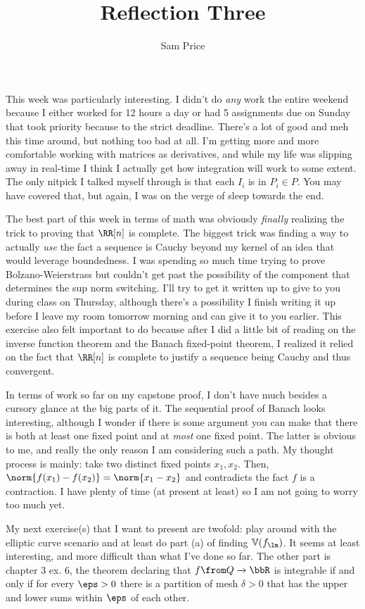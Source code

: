 \documentclass[12pt]{article}
\author{Sam Price}
\date{}
\title{Reflection Three}
\begin{document}
\maketitle

This week was particularly interesting.
I didn't do \emph{any} work the entire weekend because I either worked for 12 hours a day or had
5 assignments due on Sunday that took priority because to the strict deadline.
There's a lot of good and meh this time around, but nothing too bad at all.
I'm getting more and more comfortable working with matrices as derivatives, and while my life
was slipping away in real-time I think I actually get how integration will work to some extent.
The only nitpick I talked myself through is that each $I_{i}$ is in $P_{i} \in P$.
You may have covered that, but again, I was on the verge of sleep towards the end.

The best part of this week in terms of math was obviously \emph{finally} realizing the trick to proving that $\RR[n]$ is complete.
The biggest trick was finding a way to actually \emph{use} the fact a sequence is Cauchy beyond my kernel of an
idea that would leverage boundedness.
I was spending so much time trying to prove Bolzano-Weierstrass but couldn't get past
the possibility of the component that determines the sup norm switching. I'll try to get it written up to
give to you during class on Thursday, although there's a possibility I finish writing it up before I leave my room tomorrow morning and can give it to you earlier.
This exercise also felt important to do because after I did a little bit of reading on the inverse function theorem
and the Banach fixed-point theorem, I realized it relied on the fact that $\RR[n]$ is complete to justify a sequence
being Cauchy and thus convergent.

In terms of work so far on my capstone proof, I don't have much besides a cursory glance at the big parts of it.
The sequential proof of Banach looks interesting, although I wonder if there is some argument you can make
that there is both at least one fixed point and at \emph{most} one fixed point.
The latter is obvious to me, and really the only reason I am considering such a path.
My thought process is mainly: take two distinct fixed points $x_{1}, x_{2}$.
Then, $\norm{f(x_{1}) - f(x_{2})} = \norm{x_{1} - x_{2}}$ and contradicts the fact $f$ is a contraction.
I have plenty of time (at present at least) so I am not going to worry too much yet.

My next exercise(s) that I want to present are twofold:
play around with the elliptic curve scenario and at least do part (a) of finding $\mathbb{V}(f_{\lm})$.
It seems at least interesting, and more difficult than what I've done so far.
The other part is chapter 3 ex. 6, the theorem declaring that $f \from Q \to \bbR$ is integrable if and only if
for every $\eps > 0$ there is a partition of mesh $\delta > 0$ that has the upper and lower sums within $\eps$ of
each other.
\end{document}
